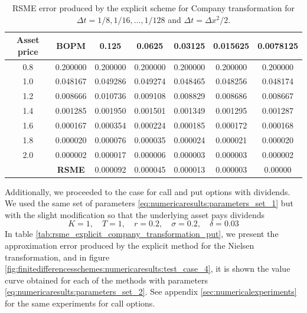 \begin{table}[H]
    \centering
    \begin{tabular}{@{}ccccccc@{}}
    \toprule
    \textbf{Asset price} & \textbf{BOPM} & 0.125    & 0.0625   & 0.03125  & 0.015625 & 0.0078125 \\ \midrule
    0.8                  & 0.200000      & 0.200000 & 0.200000 & 0.200000 & 0.200000 & 0.200000  \\
    1.0                  & 0.048167      & 0.049286 & 0.049274 & 0.048465 & 0.048256 & 0.048174  \\
    1.2                  & 0.008666      & 0.010736 & 0.009108 & 0.008829 & 0.008686 & 0.008667  \\
    1.4                  & 0.001285      & 0.001950 & 0.001501 & 0.001349 & 0.001295 & 0.001287  \\
    1.6                  & 0.000167      & 0.000354 & 0.000224 & 0.000185 & 0.000172 & 0.000168  \\
    1.8                  & 0.000020      & 0.000076 & 0.000035 & 0.000024 & 0.000021 & 0.000020  \\
    2.0                  & 0.000002      & 0.000017 & 0.000006 & 0.000003 & 0.000003 & 0.000002  \\
    & \textbf{RSME} & 0.000092 & 0.000045 & 0.000013 & 0.000003 & 0.00000   \\ \bottomrule
    \end{tabular}
    \caption{\label{tab:rsme_explicit_company_transformation}RSME error produced by the explicit scheme for Company transformation for $\Delta{t}=1/8,1/16,\dots,1/128$ and $\Delta{t}=\Delta{x}^2/2$.}
\end{table}
Additionally, we proceeded to the case for call and put options with dividends. We used the same set of parameters \eqref{eq:numericaresults:parameters_set_1} but with the slight modification so that the underlying asset pays dividends
\begin{equation}
  \label{eq:numericaresults:parameters_set_2}
  K = 1, \quad T = 1, \quad r=0.2, \quad \sigma=0.2, \quad \delta = 0.03
\end{equation}
In table \eqref{tab:rsme_explicit_company_transformation_put}, we present the approximation error produced by the explicit method for the Nielsen transformation, and in figure \eqref{fig:finitedifferencesschemes:numericaresults:test_case_4}, it is shown the value curve obtained for each of the methods with parameters \eqref{eq:numericaresults:parameters_set_2}. See appendix \eqref{sec:numericalexperiments} for the same experiments for call options.


